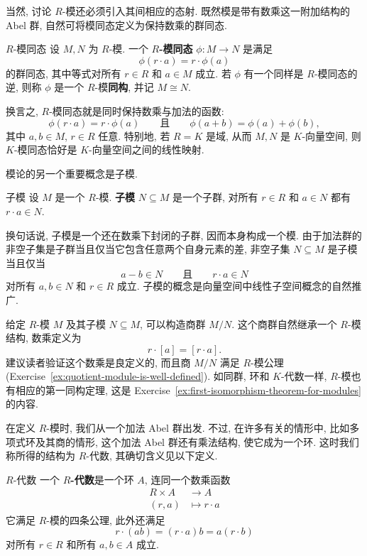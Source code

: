 当然, 讨论 $R$-模还必须引入其间相应的态射. 既然模是带有数乘这一附加结构的 Abel 群, 自然可将模同态定义为保持数乘的群同态.

\begin{Definition}{$R$-模同态}\leavevmode\label{def:module-homomorphism}
  设 $M,N$ 为 $R$-模. 一个 \textbf{$R$-模同态} $\phi:M\to N$ 是满足
  \[
    \phi(r\cdot a)=r\cdot\phi(a)
  \]
  的群同态, 其中等式对所有 $r\in R$ 和 $a\in M$ 成立. 若 $\phi$ 有一个同样是 $R$-模同态的逆, 则称 $\phi$ 是一个 $R$-模\textbf{同构}, 并记 $M\cong N$.
\end{Definition}

换言之, $R$-模同态就是同时保持数乘与加法的函数:
\[
  \phi(r\cdot a)=r\cdot\phi(a)
  \qquad\text{且}\qquad
  \phi(a+b)=\phi(a)+\phi(b),
\]
其中 $a,b\in M$, $r\in R$ 任意. 特别地, 若 $R=K$ 是域, 从而 $M,N$ 是 $K$-向量空间, 则 $K$-模同态恰好是 $K$-向量空间之间的线性映射.

模论的另一个重要概念是子模.

\begin{Definition}{子模}\leavevmode\label{def:submodule}
  设 $M$ 是一个 $R$-模. \textbf{子模} $N\subseteq M$ 是一个子群, 对所有 $r\in R$ 和 $a\in N$ 都有 $r\cdot a\in N$.
\end{Definition}

换句话说, 子模是一个还在数乘下封闭的子群, 因而本身构成一个模. 由于加法群的非空子集是子群当且仅当它包含任意两个自身元素的差, 非空子集 $N\subseteq M$ 是子模当且仅当
\[
  a-b\in N\qquad\text{且}\qquad r\cdot a\in N
\]
对所有 $a,b\in N$ 和 $r\in R$ 成立. 子模的概念是向量空间中线性子空间概念的自然推广.

给定 $R$-模 $M$ 及其子模 $N\subseteq M$, 可以构造商群 $M/N$. 这个商群自然继承一个 $R$-模结构, 数乘定义为
\[
  r\cdot[a]=[r\cdot a].
\]
建议读者验证这个数乘是良定义的, 而且商 $M/N$ 满足 $R$-模公理 (Exercise~\ref{ex:quotient-module-is-well-defined}). 如同群, 环和 $K$-代数一样, $R$-模也有相应的第一同构定理, 这是 Exercise~\ref{ex:first-isomorphism-theorem-for-modules} 的内容.

在定义 $R$-模时, 我们从一个加法 Abel 群出发. 不过, 在许多有关的情形中, 比如多项式环及其商的情形, 这个加法 Abel 群还有乘法结构, 使它成为一个环. 这时我们称所得的结构为 $R$-代数, 其确切含义见以下定义.

\begin{Definition}{$R$-代数}\leavevmode\label{def:r-algebra}
  一个 \textbf{$R$-代数}是一个环 $A$, 连同一个数乘函数
  \[
    \begin{aligned}
      R\times A&\to A\\
      (r,a)&\mapsto r\cdot a
    \end{aligned}
  \]
  它满足 $R$-模的四条公理, 此外还满足
  \[
    r\cdot(ab)=(r\cdot a)b=a(r\cdot b)
  \]
  对所有 $r\in R$ 和所有 $a,b\in A$ 成立.
\end{Definition}

